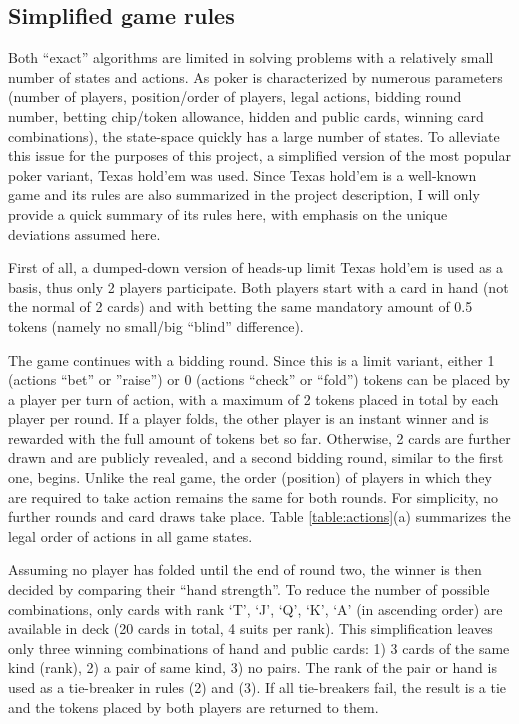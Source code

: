 \begin{appendices}

\section{Simplified game rules}
\label{app:rules}

Both ``exact'' algorithms are limited in solving problems with a relatively small number of states and actions. As poker is characterized by numerous parameters (number of players, position/order of players, legal actions, bidding round number, betting chip/token allowance, hidden and public cards, winning card combinations), the state-space quickly has a large number of states. To alleviate this issue for the purposes of this project, a simplified version of the most popular poker variant, Texas hold'em was used. Since Texas hold'em is a well-known game and its rules are also summarized in the project description, I will only provide a quick summary of its rules here, with emphasis on the unique deviations assumed here.

First of all, a dumped-down version of heads-up limit Texas hold'em is used as a basis, thus only 2 players participate. Both players start with a card in hand (not the normal of 2 cards) and with betting the same mandatory amount of 0.5 tokens (namely no small/big ``blind'' difference). 

The game continues with a bidding round. Since this is a limit variant, either 1 (actions ``bet'' or ''raise'') or 0 (actions ``check'' or ``fold'') tokens can be placed by a player per turn of action, with a maximum of 2 tokens placed in total by each player per round. If a player folds, the other player is an instant winner and is rewarded with the full amount of tokens bet so far. Otherwise, 2 cards are further drawn and are publicly revealed, and a second bidding round, similar to the first one, begins. Unlike the real game, the order (position) of players in which they are required to take action remains the same for both rounds. For simplicity, no further rounds and card draws take place. Table \ref{table:actions}(a) summarizes the legal order of actions in all game states.

Assuming no player has folded until the end of round two, the winner is then decided by comparing their ``hand strength''. To reduce the number of possible combinations, only cards with rank `T', `J', `Q', `K', `A' (in ascending order) are available in deck (20 cards in total, 4 suits per rank). This simplification leaves only three winning combinations of hand and public cards: 1) 3 cards of the same kind (rank), 2) a pair of same kind, 3) no pairs. The rank of the pair or hand is used as a tie-breaker in rules (2) and (3). If all tie-breakers fail, the result is a tie and the tokens placed by both players are returned to them.


\end{appendices}
